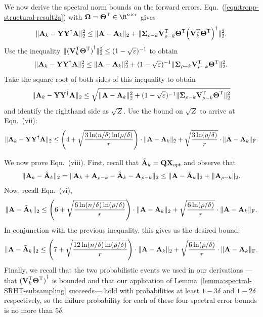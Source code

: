 We now derive the spectral norm bounds on the forward errors. Eqn.~(\ref{eqn:tropp-structural-result2a}) with  $\matOmega = \matTh\transp \in \R^{n \times r}$ gives
\[
 \mbox{}\|{\bm{\mathrm{A}}}_k - {\bm{\mathrm{Y}}} {{\bm{\mathrm{Y}}}}^\dagger {\ensuremath{\bm{\mathrm{A}}}}\|_2^2 \leq \mbox{}\|{\bm{\mathrm{A}}} - {\bm{\mathrm{A}}}_k\|_2 +
 \mbox{}\|{\bm{\mathrm{\Sigma}}}_{\rho - k} {\bm{\mathrm{V}}}_{\rho-k} ^{\textsc{T}} {\bm{\mathrm{\Theta}}}^{\textsc{T}} {\left( {\bm{\mathrm{V}}}_k ^{\textsc{T}} {\bm{\mathrm{\Theta}}}^{\textsc{T}} \right)}^\dagger \|_2^2.
\]
Use the inequality  $\mbox{}\| {( {\bm{\mathrm{V}}}_k ^{\textsc{T}} {\bm{\mathrm{\Theta}}} ^{\textsc{T}})}^\dagger \|_2^2 \leq (1 - \sqrt{\varepsilon})^{-1}$  to obtain
$$
\mbox{}\|{\bm{\mathrm{A}}}_k - {\bm{\mathrm{Y}}} {{\bm{\mathrm{Y}}}}^\dagger {\ensuremath{\bm{\mathrm{A}}}}\|_2^2 \leq
\mbox{}\|{\bm{\mathrm{A}}} - {\bm{\mathrm{A}}}_k\|_2^2 +
(1 - \sqrt{\varepsilon})^{-1}  \mbox{}\|{\bm{\mathrm{\Sigma}}}_{\rho - k} {\bm{\mathrm{V}}}_{\rho-k} ^{\textsc{T}} {\bm{\mathrm{\Theta}}}^{\textsc{T}}  \|_2^2.
$$
Take the square-root of both sides of this inequality to obtain
$$
\mbox{}\|{\bm{\mathrm{A}}}_k - {\bm{\mathrm{Y}}} {{\bm{\mathrm{Y}}}}^\dagger {\ensuremath{\bm{\mathrm{A}}}}\|_2 \leq
\sqrt{ \mbox{}\|{\bm{\mathrm{A}}} - {\bm{\mathrm{A}}}_k\|_2^2 + (1 - \sqrt{\varepsilon})^{-1}  \mbox{}\|{\bm{\mathrm{\Sigma}}}_{\rho - k} {\bm{\mathrm{V}}}_{\rho-k} ^{\textsc{T}} {\bm{\mathrm{\Theta}}}^{\textsc{T}} \|_2^2 }
$$
and identify the righthand side as $\sqrt{Z}.$ Use the bound on $\sqrt{Z}$ to arrive at Eqn.~(vii):
\[
\mbox{}\|{\bm{\mathrm{A}}}_k - {\bm{\mathrm{Y}}} {{\bm{\mathrm{Y}}}}^\dagger {\ensuremath{\bm{\mathrm{A}}}}\|_2 \leq
\left(4 + \sqrt{{3 \ln(n/\delta)\ln(\rho/\delta)\over r}} \right) \cdot \mbox{}\|{\bm{\mathrm{A}}} - {\bm{\mathrm{A}}}_k\|_2  +
\sqrt{{3 \ln(\rho/\delta)\over r}} \cdot \mbox{}\|{\bm{\mathrm{A}}} - {\bm{\mathrm{A}}}_k\|_\mathrm{F}.
\]

We now prove Eqn.~(viii). First, recall that $\tilde{{\bm{\mathrm{A}}}}_k = {\bm{\mathrm{Q}}}{\bm{\mathrm{X}}}_{opt}$ and observe that
\[
\mbox{}\|{\bm{\mathrm{A}}}_k - \tilde{{\bm{\mathrm{A}}}}_k  \|_2 =  \mbox{}\|{\bm{\mathrm{A}}}_k + {\bm{\mathrm{A}}}_{\rho-k} - \tilde{{\bm{\mathrm{A}}}}_k - {\bm{\mathrm{A}}}_{\rho-k} \|_2  \le
 \mbox{}\|{\bm{\mathrm{A}}} -\tilde{{\bm{\mathrm{A}}}}_k \|_2 + \mbox{}\| {\bm{\mathrm{A}}}_{\rho-k} \|_2.
\]
Now, recall  Eqn.~(vi),
\[
\mbox{}\|{\bm{\mathrm{A}}} - \tilde{{\bm{\mathrm{A}}}}_k\|_2 \leq \left(6 +
 \sqrt{{6 \ln(n/\delta)\ln(\rho/\delta)\over r}} \right) \cdot \mbox{}\|{\bm{\mathrm{A}}} - {\bm{\mathrm{A}}}_k\|_2 +
 \sqrt{{6 \ln(\rho/\delta)\over r}} \cdot \mbox{}\|{\bm{\mathrm{A}}} - {\bm{\mathrm{A}}}_k\|_\mathrm{F}.
\]
In conjunction with the previous inequality, this gives us the desired bound:
\[
\mbox{}\|{\bm{\mathrm{A}}} - \tilde{{\bm{\mathrm{A}}}}_k\|_2 \leq \left(7 +
 \sqrt{{12 \ln(n/\delta)\ln(\rho/\delta)\over r}} \right) \cdot \mbox{}\|{\bm{\mathrm{A}}} - {\bm{\mathrm{A}}}_k\|_2 +
 \sqrt{{6 \ln(\rho/\delta)\over r}} \cdot \mbox{}\|{\bm{\mathrm{A}}} - {\bm{\mathrm{A}}}_k\|_\mathrm{F}.
\]
Finally, we recall that the two probabilistic events we used in our derivations --- that ${({\bm{\mathrm{V}}}_k^{\textsc{T}}{\bm{\mathrm{\Theta}}}^{\textsc{T}})}^\dagger$ is bounded and that our application of
Lemma~\ref{lemma:spectral-SRHT-subsampling} succeeds--- hold with probabilities at least $1 - 3\delta$ and $1 - 2\delta$ respectively, so the failure probability for
each of these four spectral error bounds is no more than $5\delta.$

